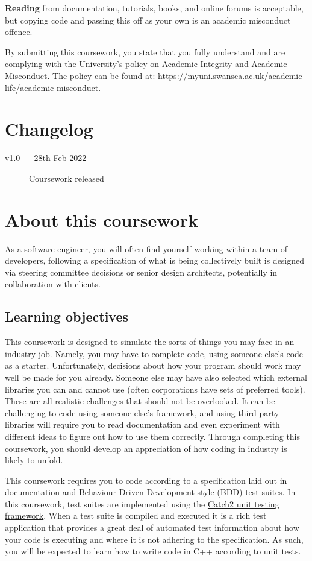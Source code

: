 \documentclass[a4paper]{article}
\begin{document}
\textbf{Reading} from documentation, tutorials, books, and online forums is acceptable, but copying code and passing this off as your own is an academic misconduct offence.

By submitting this coursework, you state that you fully understand and are complying with the University’s policy on Academic Integrity and Academic Misconduct. The policy can be found at: \url{https://myuni.swansea.ac.uk/academic-life/academic-misconduct}.


\section*{Changelog}\label{sec:changelog}
\begin{description}
    \item[v1.0 --- 28th Feb 2022] Coursework released
\end{description}



\newpage\section*{About this coursework}\label{sec:about}
As a software engineer, you will often find yourself working within a team of developers, following a specification of what is being collectively built is designed via steering committee decisions or senior design architects, potentially in collaboration with clients. 

\subsection*{Learning objectives}
This coursework is designed to simulate the sorts of things you may face in an industry job. Namely, you may have to complete code, using someone else’s code as a starter. Unfortunately, decisions about how your program should work may well be made for you already. Someone else may have also selected which external libraries you can and cannot use (often corporations have sets of preferred tools). These are all realistic challenges that should not be overlooked. It can be challenging to code using someone else’s framework, and using third party libraries will require you to read documentation and even experiment with different ideas to figure out how to use them correctly. Through completing this coursework, you should develop an appreciation of how coding in industry is likely to unfold.

This coursework requires you to code according to a specification laid out in documentation and Behaviour Driven Development style (BDD) test suites. In this coursework, test suites are implemented using the \href{https://github.com/catchorg/Catch2}{Catch2 unit testing framework}. When a test suite is compiled and executed it is a rich test application that provides a great deal of automated test information about how your code is executing and where it is not adhering to the specification. As such, you will be expected to learn how to write code in C++ according to unit tests.
\end{document}
